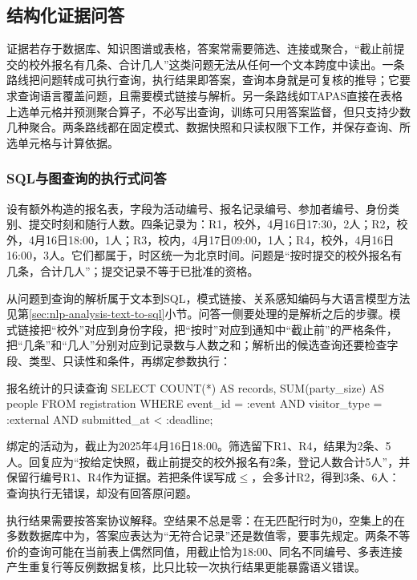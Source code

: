 \subsection{结构化证据问答}
\label{sec:nlp-dialogue-structured-qa}

证据若存于数据库、知识图谱或表格，答案常需要筛选、连接或聚合，“截止前提交的校外报名有几条、合计几人”这类问题无法从任何一个文本跨度中读出。一条路线把问题转成可执行查询，执行结果即答案，查询本身就是可复核的推导；它要求查询语言覆盖问题，且需要模式链接与解析。另一条路线如TAPAS直接在表格上选单元格并预测聚合算子，不必写出查询，训练可只用答案监督，但只支持少数几种聚合。两条路线都在固定模式、数据快照和只读权限下工作，并保存查询、所选单元格与计算依据。

\subsubsection{SQL与图查询的执行式问答}
\label{sec:nlp-dialogue-execution-qa}

设有额外构造的报名表，字段为活动编号、报名记录编号、参加者编号、身份类别、提交时刻和随行人数。四条记录为：R1，校外，4月16日17:30，2人；R2，校外，4月16日18:00，1人；R3，校内，4月17日09:00，1人；R4，校外，4月16日16:00，3人。它们都属于，时区统一为北京时间。问题是“按时提交的校外报名有几条，合计几人”；提交记录不等于已批准的资格。

从问题到查询的解析属于文本到SQL，模式链接、关系感知编码与大语言模型方法见第\ref{sec:nlp-analysis-text-to-sql}小节。问答一侧要处理的是解析之后的步骤。模式链接把“校外”对应到身份字段，把“按时”对应到通知中“截止前”的严格条件，把“几条”和“几人”分别对应到记录数与人数之和；解析出的候选查询还要检查字段、类型、只读性和条件，再绑定参数执行：
\begin{codeblock}[language=SQL,label={code:nlp-dialogue-sql},unbreakable]{报名统计的只读查询}
SELECT COUNT(*) AS records,
       SUM(party_size) AS people
FROM registration
WHERE event_id = :event
  AND visitor_type = :external
  AND submitted_at < :deadline;
\end{codeblock}
绑定的活动为，截止为2025年4月16日18:00。筛选留下R1、R4，结果为2条、5人。回复应为“按给定快照，截止前提交的校外报名有2条，登记人数合计5人”，并保留行编号R1、R4作为证据。若把条件误写成$\leq$，会多计R2，得到3条、6人：查询执行无错误，却没有回答原问题。

执行结果需要按答案协议解释。空结果不总是零：在无匹配行时为0，空集上的在多数数据库中为，答案应表达为“无符合记录”还是数值零，要事先规定。两条不等价的查询可能在当前表上偶然同值，用截止恰为18:00、同名不同编号、多表连接产生重复行等反例数据复核，比只比较一次执行结果更能暴露语义错误。

